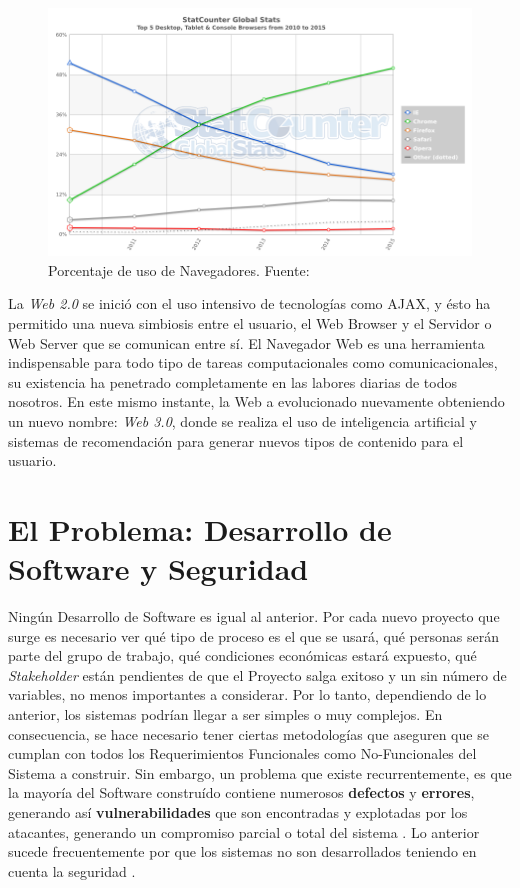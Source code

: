     \begin{figure}[h]
        \centering
        \includegraphics[width=1\textwidth]{figures/StatCounter-browser-ww-yearly-2010-2015.png}
        \caption{Porcentaje de uso de Navegadores. Fuente: \cite{statBrow}}
        \label{fig:UsageShare}
    \end{figure}

La \textit{Web 2.0} se inició con el uso intensivo de tecnologías como AJAX, y ésto ha permitido una nueva simbiosis entre el usuario, el Web Browser y el Servidor o Web Server que se comunican entre sí. El Navegador Web es una herramienta indispensable para todo tipo de tareas computacionales como comunicacionales, su existencia ha penetrado completamente en las labores diarias de todos nosotros. En este mismo instante, la Web a evolucionado nuevamente obteniendo un nuevo nombre: \textit{Web 3.0}, donde se realiza el uso de inteligencia artificial y sistemas de recomendación para generar nuevos tipos de contenido para el usuario.


\section{El Problema: Desarrollo de Software y Seguridad}
\label{chap1:SD_SS}

Ningún Desarrollo de Software es igual al anterior. Por cada nuevo proyecto que surge es necesario ver qué tipo de proceso es el que se usará, qué personas serán parte del grupo de trabajo, qué condiciones económicas estará expuesto, qué \textit{Stakeholder} están pendientes de que el Proyecto salga exitoso y un sin número de variables, no menos importantes a considerar. Por lo tanto, dependiendo de lo anterior, los sistemas podrían llegar a ser simples o muy complejos. En consecuencia, se hace necesario tener ciertas metodologías que aseguren que se cumplan con todos los Requerimientos Funcionales como No-Funcionales del Sistema a construir. Sin embargo, un problema que existe recurrentemente, es que la mayoría del Software construído contiene numerosos \textbf{defectos} y \textbf{errores}, generando así \textbf{vulnerabilidades} que son encontradas y explotadas por los atacantes, generando un compromiso parcial o total del sistema \cite{goertzel2007software}. Lo anterior sucede frecuentemente por que los sistemas no son desarrollados teniendo en cuenta la seguridad \cite{Yoder1998, fernandez2004methodology, WhyteHarrison}.

